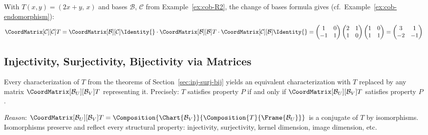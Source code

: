 \begin{example}
    With $T(x,y) = (2x+y,\, x)$ and bases $\mathcal{B}$, $\mathcal{C}$ from
    Example~\ref{ex:cob-R2}, the change of bases formula gives (cf.\
    Example~\ref{ex:cob-endomorphism}):
    \[
        \CoordMatrix[\mathcal{C}][\mathcal{C}]{T}
        = \CoordMatrix[\mathcal{B}][\mathcal{C}]{\Identity{}}
          \cdot \CoordMatrix[\mathcal{B}][\mathcal{B}]{T}
          \cdot \CoordMatrix[\mathcal{C}][\mathcal{B}]{\Identity{}}
        = \begin{pmatrix}1&0\\-1&1\end{pmatrix}
          \begin{pmatrix}2&1\\1&0\end{pmatrix}
          \begin{pmatrix}1&0\\1&1\end{pmatrix}
        = \begin{pmatrix} 3 & 1 \\ -2 & -1 \end{pmatrix}
    \]
\end{example}

\subsection{Injectivity, Surjectivity, Bijectivity via Matrices}

\begin{remark}
\label{rem:substitution-principle}
    Every characterization of $T$ from the theorems of
    Section~\ref{sec:inj-surj-bij} yields an equivalent characterization with $T$ replaced
    by any matrix $\CoordMatrix[\mathcal{B}_U][\mathcal{B}_V]{T}$ representing it.
    Precisely: $T$ satisfies property $P$ if and only if
    $\CoordMatrix[\mathcal{B}_U][\mathcal{B}_V]{T}$ satisfies property $P$.

    \textit{Reason}: $\CoordMatrix[\mathcal{B}_U][\mathcal{B}_V]{T}
    = \Composition{\Chart{\mathcal{B}_V}}{\Composition{T}{\Frame{\mathcal{B}_U}}}$
    is a conjugate of $T$ by isomorphisms. Isomorphisms preserve and reflect every structural
    property: injectivity, surjectivity, kernel dimension, image dimension, etc.
\end{remark}

